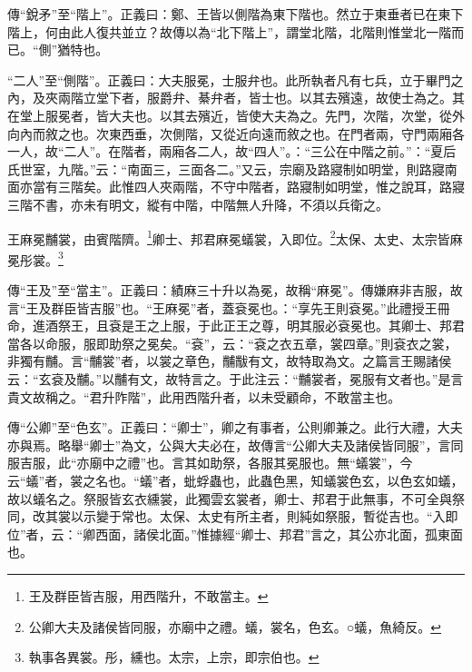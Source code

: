 {\noindent\zhuan{}\fzbyks 傳“銳矛”至“階上”。正義曰：鄭、王皆以側階為東下階也。然立于東垂者已在東下階上，何由此人復共並立？故傳以為“北下階上”，謂堂北階，北階則惟堂北一階而已。“側”猶特也。 \par}

{\noindent\shu{}\fzkt “二人”至“側階”。正義曰：大夫服冕，士服弁也。此所執者凡有七兵，立于畢門之內，及夾兩階立堂下者，服爵弁、綦弁者，皆士也。以其去殯遠，故使士為之。其在堂上服冕者，皆大夫也。以其去殯近，皆使大夫為之。先門，次階，次堂，從外向內而敘之也。次東西垂，次側階，又從近向遠而敘之也。在門者兩，守門兩廂各一人，故“二人”。在階者，兩廂各二人，故“四人”。：“三公在中階之前。”：“夏后氏世室，九階。”云：“南面三，三面各二。”又云，宗廟及路寢制如明堂，則路寢南面亦當有三階矣。此惟四人夾兩階，不守中階者，路寢制如明堂，惟之說耳，路寢三階不書，亦未有明文，縱有中階，中階無人升降，不須以兵衛之。 \par}

王麻冕黼裳，由賓階隮。\footnote{王及群臣皆吉服，用西階升，不敢當主。}卿士、邦君麻冕蟻裳，入即位。\footnote{公卿大夫及諸侯皆同服，亦廟中之禮。蟻，裳名，色玄。○蟻，魚綺反。}太保、太史、太宗皆麻冕彤裳。\footnote{執事各異裳。彤，纁也。太宗，上宗，即宗伯也。}


{\noindent\zhuan{}\fzbyks 傳“王及”至“當主”。正義曰：績麻三十升以為冕，故稱“麻冕”。傳嫌麻非吉服，故言“王及群臣皆吉服”也。“王麻冕”者，蓋袞冕也。：“享先王則袞冕。”此禮授王冊命，進酒祭王，且袞是王之上服，于此正王之尊，明其服必袞冕也。其卿士、邦君當各以命服，服即助祭之冕矣。“袞”，云：“袞之衣五章，裳四章。”則袞衣之裳，非獨有黼。言“黼裳”者，以裳之章色，黼黻有文，故特取為文。之篇言王賜諸侯云：“玄袞及黼。”以黼有文，故特言之。于此注云：“黼裳者，冕服有文者也。”是言貴文故稱之。“君升阼階”，此用西階升者，以未受顧命，不敢當主也。 \par}

{\noindent\zhuan{}\fzbyks 傳“公卿”至“色玄”。正義曰：“卿士”，卿之有事者，公則卿兼之。此行大禮，大夫亦與焉。略舉“卿士”為文，公與大夫必在，故傳言“公卿大夫及諸侯皆同服”，言同服吉服，此“亦廟中之禮”也。言其如助祭，各服其冕服也。無“蟻裳”，今云“蟻”者，裳之名也。“蟻”者，蚍蜉蟲也，此蟲色黑，知蟻裳色玄，以色玄如蟻，故以蟻名之。祭服皆玄衣纁裳，此獨雲玄裳者，卿士、邦君于此無事，不可全與祭同，改其裳以示變于常也。太保、太史有所主者，則純如祭服，暫從吉也。“入即位”者，云：“卿西面，諸侯北面。”惟據經“卿士、邦君”言之，其公亦北面，孤東面也。 \par}

